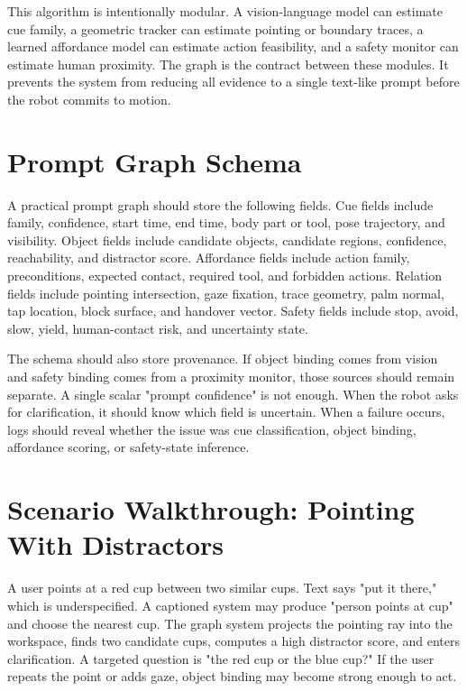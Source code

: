 \documentclass{article}
\begin{document}
This algorithm is intentionally modular. A vision-language model can estimate cue family, a geometric tracker can estimate pointing or boundary traces, a learned affordance model can estimate action feasibility, and a safety monitor can estimate human proximity. The graph is the contract between these modules. It prevents the system from reducing all evidence to a single text-like prompt before the robot commits to motion.

\section{Prompt Graph Schema}

A practical prompt graph should store the following fields. Cue fields include family, confidence, start time, end time, body part or tool, pose trajectory, and visibility. Object fields include candidate objects, candidate regions, confidence, reachability, and distractor score. Affordance fields include action family, preconditions, expected contact, required tool, and forbidden actions. Relation fields include pointing intersection, gaze fixation, trace geometry, palm normal, tap location, block surface, and handover vector. Safety fields include stop, avoid, slow, yield, human-contact risk, and uncertainty state.

The schema should also store provenance. If object binding comes from vision and safety binding comes from a proximity monitor, those sources should remain separate. A single scalar "prompt confidence" is not enough. When the robot asks for clarification, it should know which field is uncertain. When a failure occurs, logs should reveal whether the issue was cue classification, object binding, affordance scoring, or safety-state inference.

\section{Scenario Walkthrough: Pointing With Distractors}

A user points at a red cup between two similar cups. Text says "put it there," which is underspecified. A captioned system may produce "person points at cup" and choose the nearest cup. The graph system projects the pointing ray into the workspace, finds two candidate cups, computes a high distractor score, and enters clarification. A targeted question is "the red cup or the blue cup?" If the user repeats the point or adds gaze, object binding may become strong enough to act.
\end{document}
